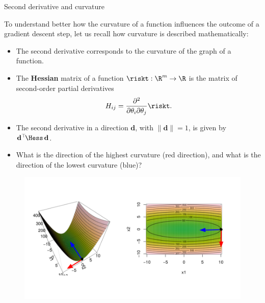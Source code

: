 \begin{vbframe}{Second derivative and curvature}

To understand better how the curvature of a function influences the outcome of a gradient descent step, let us recall how curvature is described mathematically: 

\begin{itemize}
  \item The second derivative corresponds to the curvature of the graph of a function. 
  \item The \textbf{Hessian} matrix of a function $\riskt: \R^m \to \R$ is the matrix of second-order partial derivatives
  $$
    H_{ij} = \frac{\partial^2}{\partial \theta_i \partial \theta_j} \riskt.
  $$
\end{itemize}

\framebreak 

\begin{itemize}
  \item The second derivative in a direction $\mathbf{d}$, %
   with $\|\mathbf{d}\| = 1$, is given by $\mathbf{d}^\top \!\Hess\,\mathbf{d}$.
  \item What is the direction of the highest curvature (red direction), and what is the direction of the lowest curvature (blue)?
\end{itemize}

\vspace*{-0.5cm}

\begin{figure}
\begin{center}
  \includegraphics{figure/curvature2.png}
\end{center}
\end{figure}

\framebreak


\end{vbframe}
